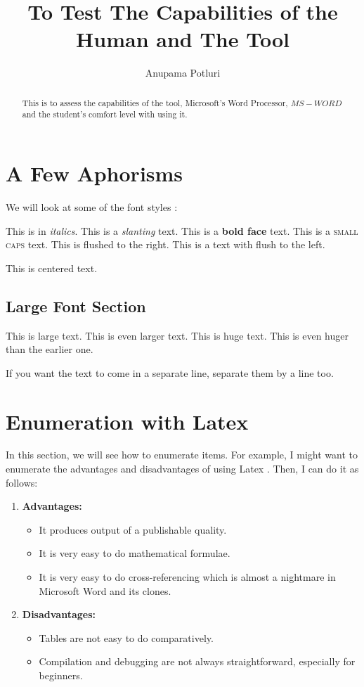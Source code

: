 \documentclass[a4paper,10pt]{article}
\title{To Test The Capabilities of the Human and The Tool}
\author{Anupama Potluri}
\begin{document}
\maketitle

\tableofcontents
\newpage

\begin{abstract}
This is to assess the capabilities of the tool, Microsoft's Word Processor, 
$MS-WORD$ and the student's comfort level with using it.
\end{abstract}

\section{A Few Aphorisms}

We will look at some of the font styles :

This is in \textit{italics}.
This is a \textsl{slanting} text.
This is a \textbf{bold face} text.
This is a \textsc{small caps} text.
\flushright This is flushed to the right.
\flushleft This is a text with flush to the left.
\begin{center}
 This is centered text.
\end{center}

\subsection{Large Font Section}
\large This is large text.
\Large This is even larger text.
\huge This is huge text.
\Huge This is even huger than the earlier one.

\normalsize If you want the text to come in a separate line, separate them by 
a line too.

\section{Enumeration with Latex}
In this section, we will see how to enumerate items. For example, I might 
want to enumerate the advantages and disadvantages of using Latex \cite{latex}. Then, I 
can do it as follows:

\begin{enumerate}
  \item {\bf Advantages:}
  \begin{itemize}
    \item It produces output of a publishable quality.
    \item It is very easy to do mathematical formulae.
    \item It is very easy to do cross-referencing which is almost a nightmare
	  in Microsoft Word and its clones.
  \end{itemize}
  \item {\bf Disadvantages:}
  \begin{itemize}
    \item Tables are not easy to do comparatively.
    \item Compilation and debugging are not always straightforward, 
	  especially for beginners.
  \end{itemize}

\end{enumerate}
\end{document}
